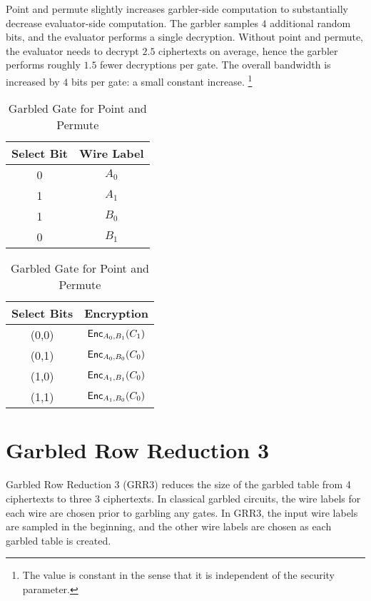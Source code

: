 Point and permute slightly increases garbler-side computation to substantially decrease evaluator-side computation.
The garbler samples $4$ additional random bits, and the evaluator performs a single decryption.
Without point and permute, the evaluator needs to decrypt $2.5$ ciphertexts on average, hence the garbler performs roughly $1.5$ fewer decryptions per gate.
The overall bandwidth is increased by $4$ bits per gate: a small constant increase. \footnote{The value is constant in the sense that it is independent of the security parameter.}

\begin{table}
    \label{tbl:point-and-permute}
    \centering
    \begin{tabular}{|c|c|}
        \hline
        Select Bit & Wire Label \\
        \hline
        0 & $A_0$ \\
        1 & $A_1$ \\
        1 & $B_0$ \\
        0 & $B_1$ \\
        \hline
    \end{tabular}
    \qquad
    \begin{tabular}{|c|c|}
        \hline
        Select Bits & Encryption \\
        \hline
        (0,0) & $\textsf{Enc}_{A_0, B_1}(C_1)$ \\
        (0,1) & $\textsf{Enc}_{A_0, B_0}(C_0)$ \\
        (1,0) & $\textsf{Enc}_{A_1, B_1}(C_0)$ \\
        (1,1) & $\textsf{Enc}_{A_1, B_0}(C_0)$ \\
        \hline
    \end{tabular}
    \caption{Garbled Gate for Point and Permute}
\end{table}

\section{Garbled Row Reduction 3}
Garbled Row Reduction 3 (GRR3) reduces the size of the garbled table from 4 ciphertexts to three 3 ciphertexts.
In classical garbled circuits, the wire labels for each wire are chosen prior to garbling any gates.
In GRR3, the input wire labels are sampled in the beginning, and the other wire labels are chosen as each garbled table is created.

